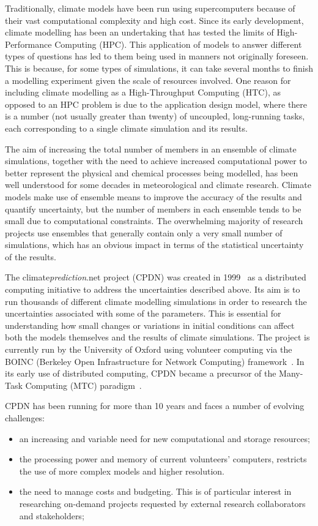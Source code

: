 \documentclass[journal abbreviation, manuscript]{copernicus}
\begin{document}
\introduction
{T}{raditionally}, climate models have been run using supercomputers because of their vast computational complexity and high cost. Since its early development, climate modelling has been an undertaking that has tested the limits of High-Performance Computing (HPC). This application of models to answer different types of questions has led to them being used in manners not originally foreseen. This is because, for some types of  simulations, it can take several months to finish a modelling experiment given the scale of resources involved. One reason for including climate modelling as a High-Throughput Computing (HTC), as opposed to an HPC problem is due to the application design model, where there is a number (not usually greater than twenty) of uncoupled, long-running tasks, each corresponding to a single climate simulation and its results.

The aim of increasing the total number of members in an ensemble of climate simulations, together with the need to achieve increased computational power to better represent the physical and chemical processes being modelled, has been well understood for some decades in meteorological and climate research. Climate models make use of ensemble means to improve the accuracy of the results and quantify uncertainty, but the number of members in each ensemble tends to be small due to computational constraints. The overwhelming majority of research projects use ensembles that generally contain only a very small number of simulations, which has an obvious impact in terms of the statistical uncertainty of the results.


The climate\textit{prediction}.net project (CPDN) was created in 1999~\citep{allen1999,CPDNweb} as a distributed computing initiative to address the uncertainties described above. Its aim is to run thousands of different climate modelling simulations in order to research the uncertainties associated with some of the parameters. This is essential for understanding how small changes or variations in initial conditions can affect both the models themselves and the results of climate simulations. The project is currently run by the University of Oxford using volunteer computing via the BOINC (Berkeley Open Infrastructure for Network Computing) framework~\citep{boinc:Online, anderson2004}. In its early use of distributed computing, CPDN became a precursor of the Many-Task Computing (MTC) paradigm~\citep{raicu2008}.

CPDN has been running for more than 10 years and faces a number of evolving challenges:
\begin{itemize}

\item an  increasing and variable need for new computational and storage resources;
\item the processing power and memory of current volunteers' computers, restricts the use of more complex models and higher resolution.
\item the need to manage costs and budgeting. This is of particular interest in researching on-demand projects requested by external research collaborators and stakeholders;
\end{itemize}
\end{document}
